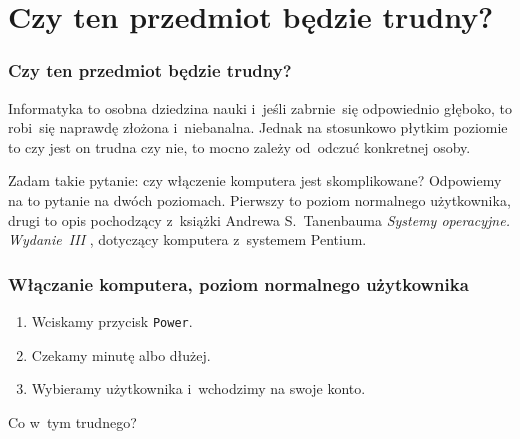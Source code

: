 \documentclass[10pt,t]{beamer}
\begin{document}
\section{Czy ten przedmiot będzie trudny?}



\begin{frame}
  \frametitle{Czy ten przedmiot będzie trudny?}


  Informatyka to osobna dziedzina nauki i~jeśli zabrnie~się odpowiednio
  głęboko, to robi~się naprawdę złożona i~niebanalna. Jednak na stosunkowo
  płytkim poziomie to czy jest on trudna czy nie, to mocno zależy od~odczuć
  konkretnej osoby.

  Zadam takie pytanie: czy włączenie komputera jest skomplikowane?
  Odpowiemy na to pytanie na dwóch poziomach. Pierwszy to poziom normalnego
  użytkownika, drugi to opis pochodzący z~książki Andrewa S.~Tanenbauma
  \textit{Systemy operacyjne. Wydanie~III}
  \parencite{Tannenbaum-Systemy-Operacyjne-Wydanie-III-Pub-2013}, dotyczący
  komputera z~systemem Pentium.

\end{frame}





\begin{frame}
  \frametitle{Włączanie komputera, poziom normalnego użytkownika}


  \begin{enumerate}

  \item Wciskamy przycisk \texttt{Power}.



  \item Czekamy minutę albo dłużej.



  \item Wybieramy użytkownika i~wchodzimy na swoje konto.

  \end{enumerate}

  Co w~tym trudnego?

\end{frame}
\end{document}
